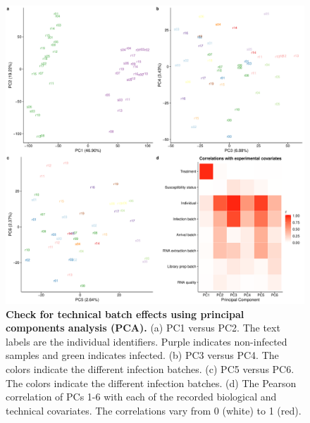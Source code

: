 \begin{figure}[ht]
\centering
\includegraphics[width=5in]{img/ch03/batch-pca.pdf}
\caption[Check for technical batch effects using principal components analysis
(PCA).]{
\textbf{Check for technical batch effects using principal components analysis
(PCA).} (a) PC1 versus PC2. The text labels are the individual
identifiers. Purple indicates non-infected samples and green indicates
infected. (b) PC3 versus PC4. The colors indicate the different
infection batches. (c) PC5 versus PC6. The colors indicate the
different infection batches. (d) The Pearson correlation of PCs 1-6
with each of the recorded biological and technical covariates. The
correlations vary from 0 (white) to 1 (red).
}
\label{fig:batch-effect}
\end{figure}

